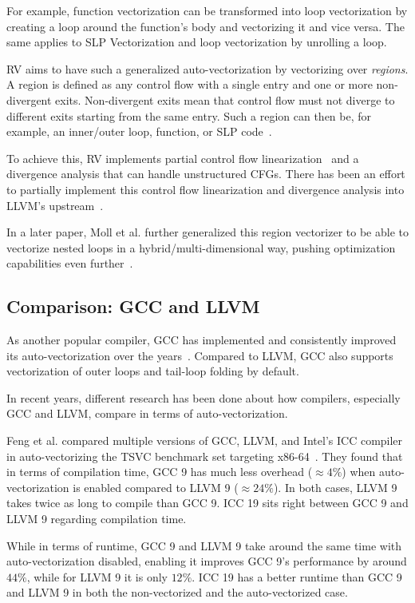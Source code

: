\documentclass[sigplan,11pt,nonacm]{acmart}
\begin{document}
For example, function vectorization can be transformed into loop vectorization by creating a loop 
around the function's body and vectorizing it and vice versa. 
The same applies to SLP Vectorization and loop vectorization by unrolling a loop.

RV aims to have such a generalized auto-vectorization by vectorizing over \textit{regions}.
A region is defined as any control flow with a single entry and one or more non-divergent exits.
Non-divergent exits mean that control flow must not diverge to different exits starting from the 
same entry.
Such a region can then be, for example, an inner/outer loop, function, or SLP code~\cite{rvintro,rvproposal}.

To achieve this, RV implements partial control flow linearization~\cite{Moll_2021,10.1145/3192366.3192413}
and a divergence analysis that can handle unstructured CFGs. There has been an effort to partially
implement this control flow linearization and divergence analysis into LLVM's 
upstream~\cite{rvproposal,rvproposaldep}.

In a later paper, Moll et al. further generalized this region vectorizer to be able to vectorize 
nested loops in a hybrid/multi-dimensional way, pushing optimization capabilities even 
further~\cite{10.1145/3303117.3306172}. 

\subsection{Comparison: GCC and LLVM}
As another popular compiler, GCC has implemented and consistently improved its auto-vectorization 
over the years~\cite{autovecoptgcc,gccvecsum}. Compared to LLVM, GCC also supports 
vectorization of outer loops and tail-loop folding by default.

In recent years, different research has been done about how compilers, especially GCC and 
LLVM, compare in terms of auto-vectorization.

Feng et al. compared multiple versions of GCC, LLVM, and Intel's ICC compiler in auto-vectorizing the 
TSVC benchmark set targeting x86-64~\cite{feng2021evaluation}. They found that in terms of compilation time, GCC 9
has much less overhead ($\approx4\%$) when auto-vectorization is enabled compared to 
LLVM 9 ($\approx24\%$). In both cases, LLVM 9 takes twice as long to compile than GCC 9. 
ICC 19 sits right between GCC 9 and LLVM 9 regarding compilation time.

While in terms of runtime, GCC 9 and LLVM 9 take around 
the same time with auto-vectorization disabled, enabling it improves GCC 9's performance by around $44\%$, 
while for LLVM 9 it is only $12\%$. ICC 19 has a better runtime than GCC 9 and LLVM 9 in both the 
non-vectorized and the auto-vectorized case.
\end{document}
